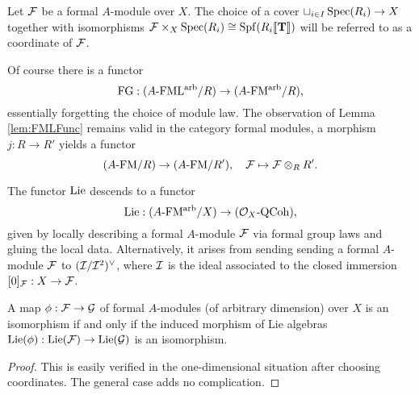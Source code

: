 \documentclass[../main.tex]{subfiles}
\begin{document}
\begin{defi}[Coordinate]
  Let $\mathcal{F}$ be a formal $A$-module over $X$. The choice of a cover $\sqcup_{i
  \in I} \operatorname{Spec}(R_i) \to X$ together with isomorphisms $\mathcal{F} \times_X \operatorname{Spec}(R_i)
  \cong \operatorname{Spf}(R_i\llbracket \mathbf{T} \rrbracket)$ will be referred to as a coordinate of $\mathcal{F}$. 
\end{defi}

Of course there is a functor 
\begin{equation*}
  \textnormal{FG}: {({A}\text-\allowbreak\mathrm{FML^{arb}}/{R})} \to {({A}\text-\allowbreak\mathrm{FM^{arb}}/{R})},
\end{equation*}
essentially forgetting the choice of module law. The observation of Lemma 
\ref{lem:FMLFunc} remains valid in the category formal modules, a morphism $j : R \to R'$ 
yields a functor 
\begin{equation*} 
  {({A}\text-\allowbreak\mathrm{FM}/{R})} \to {({A}\text-\allowbreak\mathrm{FM}/{R'})}, \quad \mathcal{F} \mapsto \mathcal{F} \otimes_R R'.
\end{equation*}

\begin{defi}
  The functor $\operatorname{Lie}$ descends to a functor 
  \begin{equation*}
    \operatorname{Lie}: {({A}\text-\allowbreak\mathrm{FM^{arb}}/{X})} \to {({\mathcal{O}_X}\text-\allowbreak\mathrm{QCoh})}, 
  \end{equation*}
  given by locally describing a formal $A$-module $\mathcal{F}$ via formal group laws and gluing the local data. Alternatively, it arises from sending 
  sending a formal $A$-module $\mathcal{F}$ to $(\mathcal{I} / \mathcal{I}^2)^\vee$, where $\mathcal{I}$ is the
  ideal associated to the closed immersion $[0]_{\mathcal{F}}: X \to \mathcal{F}$. 
\end{defi}

\begin{lem}\label{lem:IsosCheckOnLie}
  A map $\phi: \mathcal{F} \to \mathcal{G}$ of formal $A$-modules (of arbitrary dimension) over $X$ is an isomorphism if and only if the induced morphism of Lie algebras $\operatorname{Lie}(\phi): \operatorname{Lie}(\mathcal{F}) \to \operatorname{Lie}(\mathcal{G})$ is an isomorphism.
\begin{proof}
  This is easily verified in the one-dimensional situation after choosing coordinates.
  The general case adds no complication. 
\end{proof}
\end{lem}
\end{document}
